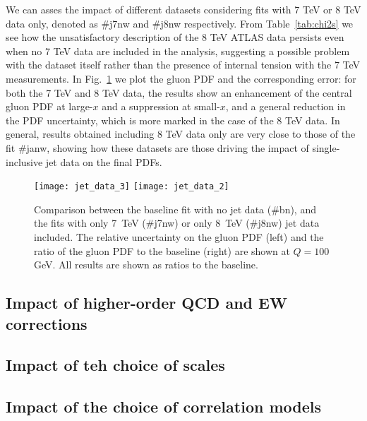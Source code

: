 %
We can asses the impact of different datasets considering fits with 7 TeV or 8 TeV data only, denoted as \#j7nw and \#j8nw
respectively. From Table~\ref{tab:chi2s} we see how the unsatisfactory description of the 8 TeV ATLAS data persists even when 
no 7 TeV data are included in the analysis, suggesting a possible problem with the dataset itself rather than 
the presence of internal tension with the 7 TeV measurements. 
In Fig.~\ref{fig:jet_data_partial}
we plot the gluon PDF and the corresponding error: for both the 7 TeV and 8 TeV data, the results show 
an enhancement of the central gluon PDF at large-$x$ and a suppression at small-$x$, and a general reduction in the 
PDF uncertainty, which is more marked in the case of the 8 TeV data. 
In general, results obtained including 8 TeV data only are very close to those of the fit \#janw, showing
how these datasets are those driving the impact of single-inclusive jet data on the final PDFs.

\begin{figure}[!t]
    \centering
    \texttt{[image: jet\_data\_3]}
    \texttt{[image: jet\_data\_2]}
    \caption{ Comparison between the baseline fit with no jet data
      (\#bn), and the fits with only 7~TeV (\#j7nw) or only 8~TeV (\#j8nw)
      jet data included. The relative uncertainty on the gluon PDF (left)
      and the ratio of the gluon PDF to the baseline (right) are shown at
      $Q=100$ GeV. All results are shown as ratios to the baseline.}
    \label{fig:jet_data_partial}
\end{figure}

\subsection{Impact of higher-order QCD and EW corrections}

\subsection{Impact of teh choice of scales}

\subsection{Impact of the choice of correlation models}


